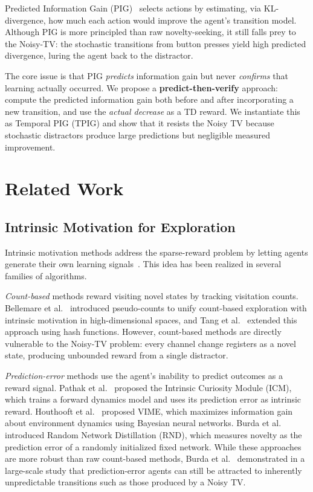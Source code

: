 \documentclass[letterpaper]{article}
\begin{document}
Predicted Information Gain
(PIG)~\cite{10.3389/fncir.2013.00037} selects actions by estimating,
via KL-divergence, how much each action would improve the agent's
transition model.  Although PIG is more principled than raw
novelty-seeking, it still falls prey to the Noisy-TV: the stochastic
transitions from button presses yield high predicted divergence, luring
the agent back to the distractor.

The core issue is that PIG \emph{predicts} information gain but never
\emph{confirms} that learning actually occurred.  We propose a
\textbf{predict-then-verify} approach: compute the predicted
information gain both before and after incorporating a new transition,
and use the \emph{actual decrease} as a TD reward.  We instantiate
this as Temporal PIG (TPIG) and show that it resists the Noisy TV
because stochastic distractors produce large predictions but
negligible measured improvement.

\section{Related Work}

\subsection{Intrinsic Motivation for Exploration}

Intrinsic motivation methods address the sparse-reward problem by
letting agents generate their own learning
signals~\cite{DBLP:journals/corr/abs-1908-06976,FToCFaIM:Jurgen}.
This idea has been realized in several families of algorithms.

\emph{Count-based} methods reward visiting novel states by tracking
visitation counts.  Bellemare et
al.~\cite{Bellemare2016counting} introduced pseudo-counts to unify
count-based exploration with intrinsic motivation in
high-dimensional spaces, and Tang et
al.~\cite{DBLP:journals/corr/TangHFSCDSTA16} extended this approach
using hash functions.  However, count-based methods are directly
vulnerable to the Noisy-TV problem: every channel change registers
as a novel state, producing unbounded reward from a single
distractor.

\emph{Prediction-error} methods use the agent's inability to predict
outcomes as a reward signal.  Pathak et
al.~\cite{Pathak2017ICM} proposed the Intrinsic Curiosity Module
(ICM), which trains a forward dynamics model and uses its prediction
error as intrinsic reward.  Houthooft et
al.~\cite{Rein:VIME} proposed VIME, which maximizes information gain
about environment dynamics using Bayesian neural networks.  Burda et
al.~\cite{Burda2019RND} introduced Random Network Distillation (RND),
which measures novelty as the prediction error of a randomly
initialized fixed network.  While these approaches are more robust
than raw count-based methods, Burda et
al.~\cite{Burda2019curiosity} demonstrated in a large-scale study
that prediction-error agents can still be attracted to inherently
unpredictable transitions such as those produced by a Noisy TV.
\end{document}
